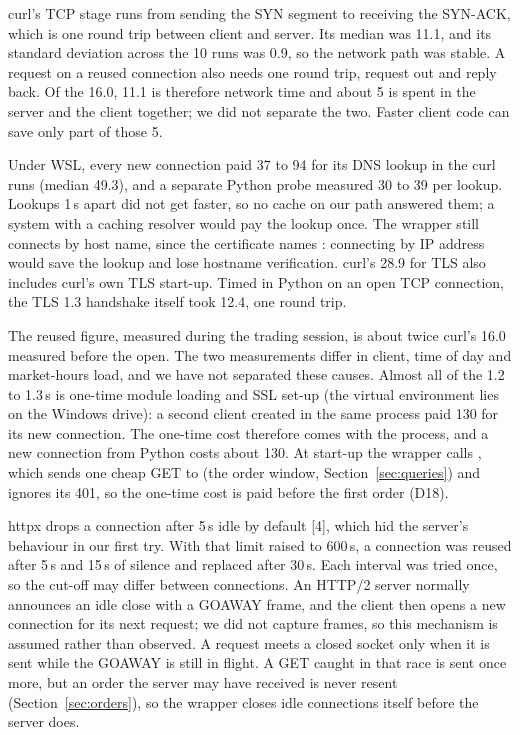  curl's TCP stage runs from sending the SYN segment to receiving the SYN-ACK, which is one round trip between client and server. Its median was 11.1\ms, and its standard deviation across the 10 runs was 0.9\ms, so the network path was stable. A request on a reused connection also needs one round trip, request out and reply back. Of the 16.0\ms, 11.1\ms{} is therefore network time and about 5\ms{} is spent in the server and the client together; we did not separate the two. Faster client code can save only part of those 5\ms.

 Under WSL, every new connection paid 37 to 94\ms{} for its DNS lookup in the curl runs (median 49.3\ms), and a separate Python probe measured 30 to 39\ms{} per lookup. Lookups 1\,s apart did not get faster, so no cache on our path answered them; a system with a caching resolver would pay the lookup once. The wrapper still connects by host name, since the certificate names : connecting by IP address would save the lookup and lose hostname verification. curl's 28.9\ms{} for TLS also includes curl's own TLS start-up. Timed in Python on an open TCP connection, the TLS 1.3 handshake itself took 12.4\ms, one round trip.

 The reused figure, measured during the trading session, is about twice curl's 16.0\ms{} measured before the open. The two measurements differ in client, time of day and market-hours load, and we have not separated these causes. Almost all of the 1.2 to 1.3\,s is one-time module loading and SSL set-up (the virtual environment lies on the Windows drive): a second client created in the same process paid 130\ms{} for its new connection. The one-time cost therefore comes with the process, and a new connection from Python costs about 130\ms. At start-up the wrapper calls , which sends one cheap GET to  (the order window, Section~\ref{sec:queries}) and ignores its 401, so the one-time cost is paid before the first order (D18).

 httpx drops a connection after 5\,s idle by default [4], which hid the server's behaviour in our first try. With that limit raised to 600\,s, a connection was reused after 5\,s and 15\,s of silence and replaced after 30\,s. Each interval was tried once, so the cut-off may differ between connections. An HTTP/2 server normally announces an idle close with a GOAWAY frame, and the client then opens a new connection for its next request; we did not capture frames, so this mechanism is assumed rather than observed. A request meets a closed socket only when it is sent while the GOAWAY is still in flight. A GET caught in that race is sent once more, but an order the server may have received is never resent (Section~\ref{sec:orders}), so the wrapper closes idle connections itself before the server does.


